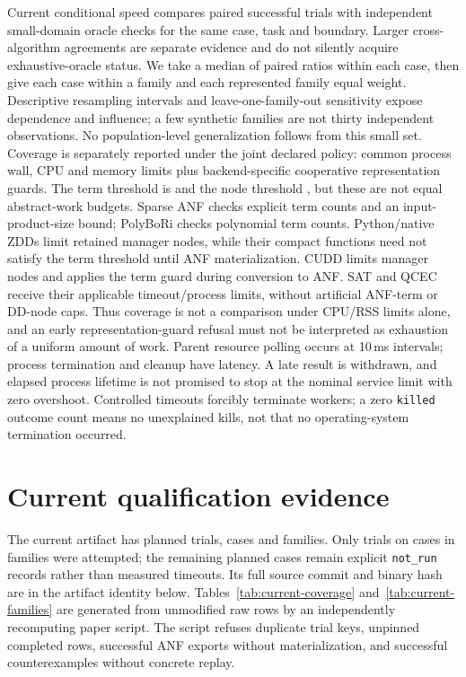 \documentclass[10pt,a4paper]{article}
\begin{document}
Current conditional speed compares paired successful trials with independent small-domain
oracle checks for the same case, task and boundary. Larger cross-algorithm agreements are
separate evidence and do not silently acquire exhaustive-oracle status.
We take a median of paired ratios within each case, then give each case within a family and
each represented family equal weight. Descriptive resampling intervals and leave-one-family-out
sensitivity expose dependence and influence; a few synthetic families are not thirty
independent observations. No population-level generalization follows from this small set.
Coverage is separately reported under the joint declared policy: common process wall,
CPU and memory limits plus backend-specific cooperative representation guards.
The term threshold is \QualMaxTerms{} and the node threshold \QualMaxNodes{}, but these
are not equal abstract-work budgets. Sparse ANF checks explicit term counts and an
input-product-size bound; PolyBoRi checks polynomial term counts. Python/native ZDDs
limit retained manager nodes, while their compact functions need not satisfy the term
threshold until ANF materialization. CUDD limits manager nodes and applies the term
guard during conversion to ANF. SAT and QCEC receive their applicable timeout/process
limits, without artificial ANF-term or DD-node caps. Thus coverage is not a comparison
under CPU/RSS limits alone, and an early representation-guard refusal must not be
interpreted as exhaustion of a uniform amount of work.
Parent resource polling occurs at 10\,ms intervals; process termination and cleanup have
latency. A late result is withdrawn, and elapsed process lifetime is not promised to stop
at the nominal service limit with zero overshoot.
Controlled timeouts forcibly terminate workers; a zero \texttt{killed} outcome count means
no unexplained kills, not that no operating-system termination occurred.

\section{Current qualification evidence}\label{sec:results}
The current artifact has \QualTrials{} planned trials, \QualCases{} cases and
\QualFamilies{} families. Only \QualRunTrials{} trials on \QualRunCases{} cases in
\QualRunFamilies{} families were attempted; the remaining planned cases remain explicit
\texttt{not\_run} records rather than measured timeouts. Its full source commit and binary hash are in the artifact identity
below. Tables~\ref{tab:current-coverage} and~\ref{tab:current-families} are generated from
unmodified raw rows by an independently recomputing paper script. The script refuses duplicate
trial keys, unpinned completed rows, successful ANF exports without materialization, and
successful counterexamples without concrete replay.
\end{document}
